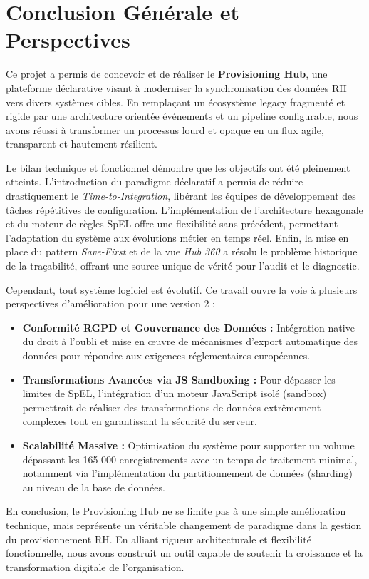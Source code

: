 \chapter*{Conclusion Générale et Perspectives}

Ce projet a permis de concevoir et de réaliser le \textbf{Provisioning Hub}, une plateforme déclarative visant à moderniser la synchronisation des données RH vers divers systèmes cibles. En remplaçant un écosystème legacy fragmenté et rigide par une architecture orientée événements et un pipeline configurable, nous avons réussi à transformer un processus lourd et opaque en un flux agile, transparent et hautement résilient.

Le bilan technique et fonctionnel démontre que les objectifs ont été pleinement atteints. L'introduction du paradigme déclaratif a permis de réduire drastiquement le \textit{Time-to-Integration}, libérant les équipes de développement des tâches répétitives de configuration. L'implémentation de l'architecture hexagonale et du moteur de règles SpEL offre une flexibilité sans précédent, permettant l'adaptation du système aux évolutions métier en temps réel. Enfin, la mise en place du pattern \textit{Save-First} et de la vue \textit{Hub 360} a résolu le problème historique de la traçabilité, offrant une source unique de vérité pour l'audit et le diagnostic.

Cependant, tout système logiciel est évolutif. Ce travail ouvre la voie à plusieurs perspectives d'amélioration pour une version 2 :
\begin{itemize}
    \item \textbf{Conformité RGPD et Gouvernance des Données :} Intégration native du droit à l'oubli et mise en œuvre de mécanismes d'export automatique des données pour répondre aux exigences réglementaires européennes.
    \item \textbf{Transformations Avancées via JS Sandboxing :} Pour dépasser les limites de SpEL, l'intégration d'un moteur JavaScript isolé (sandbox) permettrait de réaliser des transformations de données extrêmement complexes tout en garantissant la sécurité du serveur.
    \item \textbf{Scalabilité Massive :} Optimisation du système pour supporter un volume dépassant les 165 000 enregistrements avec un temps de traitement minimal, notamment via l'implémentation du partitionnement de données (sharding) au niveau de la base de données.
\end{itemize}

En conclusion, le Provisioning Hub ne se limite pas à une simple amélioration technique, mais représente un véritable changement de paradigme dans la gestion du provisionnement RH. En alliant rigueur architecturale et flexibilité fonctionnelle, nous avons construit un outil capable de soutenir la croissance et la transformation digitale de l'organisation.
